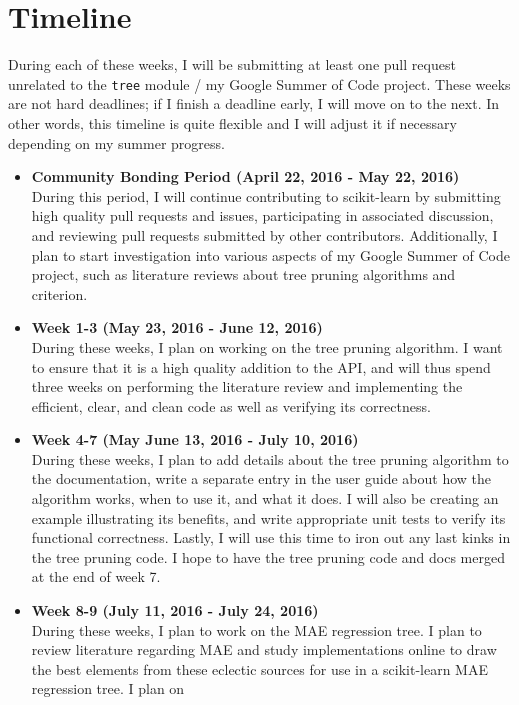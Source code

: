 \documentclass[12pt, oneside]{article}
\begin{document}
\section{Timeline}
During each of these weeks, I will be submitting at least one pull
request unrelated to the \texttt{tree} module / my Google Summer of Code project. These
weeks are not hard deadlines; if I finish a deadline early, I will
move on to the next. In other words, this timeline is quite flexible
and I will adjust it if necessary depending on my summer progress.
\begin{itemize}
  \item 
  \textbf{Community Bonding Period (April 22, 2016 - May 22,
    2016)}\\
  During this period, I will continue contributing to
  scikit-learn by submitting high quality pull requests and issues,
  participating in associated discussion, and reviewing pull requests
  submitted by other contributors. Additionally, I plan to start
  investigation into various aspects of my Google Summer of Code
  project, such as literature reviews about tree pruning algorithms
  and criterion.
  \item
  \textbf{Week 1-3 (May 23, 2016 - June 12, 2016)}\\
  During these weeks, I plan on working on the tree pruning
  algorithm. I want to ensure that it is a high quality addition to
  the API, and will thus spend three weeks on performing the
  literature review and implementing the efficient, clear, and clean
  code as well as verifying its correctness.
  \item
  \textbf{Week 4-7 (May June 13, 2016 - July 10, 2016)}\\
  During these weeks, I plan to add details about the tree
  pruning algorithm to the documentation, write a separate entry in
  the user guide about how the algorithm works, when to use it, and
  what it does. I will also be creating an example illustrating its
  benefits, and write appropriate unit tests to verify its functional
  correctness. Lastly, I will use this time to iron out any last kinks
  in the tree pruning code. I hope to have the tree pruning code and
  docs merged at the end of week 7.
  \item
  \textbf{Week 8-9 (July 11, 2016 - July 24, 2016)}\\
  During these weeks, I plan to work on the MAE regression tree. I
  plan to review literature regarding MAE and study
  implementations online to draw the best elements from these eclectic
  sources for use in a scikit-learn MAE regression tree. I plan on

\end{itemize}
\end{document}
